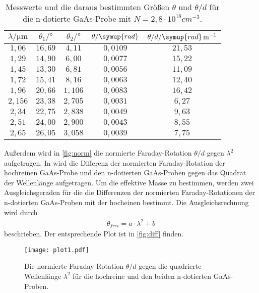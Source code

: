 \begin{table}[hbt!]
  \centering
  \caption{Messwerte und die daraus bestimmten Größen $\theta$ und $\theta/d$ für die n-dotierte GaAs-Probe
  mit $N=2,8 \cdot 10^{18} \si{cm}^{-3}$.}
  \label{tab:m3}
  \begin{tabular}{c c c c c}
    \toprule
    $\lambda/\si{\micro\meter}$ & $\theta_{1}/\si{\degree}$ & $\theta_{2}/\si{\degree}$ & $\theta/\symup{rad}$ & $\theta/d/\symup{rad}\, \si{m}^{-1}$\\
    \midrule
    $1,06 $ & $16,69$ & $4,11$  & $0,0109$ & $21,53$ \\
    $1,29 $ & $14,90$ & $6,00$  & $0,0077$ & $15,22$ \\
    $1,45 $ & $13,30$ & $6,81$  & $0,0056$ & $11,09$ \\
    $1,72 $ & $15,41$ & $8,16$  & $0,0063$ & $12,40$ \\
    $1,96 $ & $20,66$ & $1,106$ & $0,0083$ & $16,42$ \\
    $2,156$ & $23,38$ & $2,705$ & $0,0031$ & $ 6,27$ \\
    $2,34 $ & $22,75$ & $2,838$ & $0,0049$ & $ 9,63$ \\
    $2,51 $ & $24,00$ & $2,900$ & $0,0043$ & $ 8,55$ \\
    $2,65 $ & $26,05$ & $3,058$ & $0,0039$ & $ 7,75$ \\
    \bottomrule
  \end{tabular}
\end{table}
Außerdem wird in \autoref{fig:norm} die normierte Faraday-Rotation $\theta/d$ gegen $\lambda^2$ aufgetragen.
In wird die Differenz der normierten Faraday-Rotation der hochreinen GaAs-Probe und den n-dotierten GaAs-Proben
gegen das Quadrat der Wellenlänge aufgetragen. Um die effektive Masse zu bestimmen, werden zwei Ausgleichsgeraden
für die die Differenzen der normierten Faraday-Rotationen der n-dotierten GaAs-Proben mit der hocheinen bestimmt.
Die Ausgleichsrechnung wird durch
\begin{align*}
  \theta_{frei} = a\cdot \lambda^2 + b
\end{align*}
beschrieben.
Der entsprechende Plot ist in \autoref{fig:diff} finden.
\begin{figure}[hbt!]
  \texttt{[image: plot1.pdf]}
  \caption{Die normierte Faraday-Rotation $\theta/d$ gegen die quadrierte Wellenlänge $\lambda^2$ für die
  hochreine und den beiden n-dotierten GaAs-Proben.}
  \label{fig:norm}
\end{figure}

